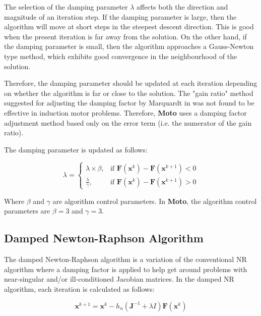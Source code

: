 \documentclass{article}
\begin{document}
The selection of the damping parameter $\lambda$ affects both the direction and magnitude of an iteration step. If the damping parameter is large, then the algorithm will move at short steps in the steepest descent direction. This is good when the present iteration is far away from the solution. On the other hand, if the damping parameter is small, then the algorithm approaches a Gauss-Newton type method, which exhibits good convergence in the neighbourhood of the solution.

Therefore, the damping parameter should be updated at each iteration depending on whether the algorithm is far or close to the solution. The "gain ratio" method suggested  for adjusting the damping factor by Marquardt in \cite{marguardt_1963}was not found to be effective in induction motor problems. Therefore, \textbf{Moto} uses a damping factor adjustment method based only on the error term (i.e. the numerator of the gain ratio). 

The damping parameter is updated as follows:

\begin{equation}
\lambda =
\begin{cases}
\lambda \times \beta, & \text{if } \mathbf{F}(\boldsymbol{x}^{k}) - \mathbf{F}(\boldsymbol{x}^{k+1}) < 0 \\
\frac{\lambda}{\gamma}, & \text{if } \mathbf{F}(\boldsymbol{x}^{k}) - \mathbf{F}(\boldsymbol{x}^{k+1}) > 0
\end{cases}
\end{equation}

Where $\beta$ and $\gamma$ are algorithm control parameters. In \textbf{Moto}, the algorithm control parameters are $\beta = 3$ and $\gamma = 3$.


\subsection{Damped Newton-Raphson Algorithm}
The damped Newton-Raphson algorithm is a variation of the conventional NR algorithm where a damping factor is applied to help get around problems with near-singular and/or ill-conditioned Jacobian matrices. In the damped NR algorithm, each iteration is calculated as follows:

\begin{equation}
\label{eqn_DNR}
\boldsymbol{x}^{k+1} = \boldsymbol{x}^{k} - h_{n} (\mathbf{J}^{-1} + \lambda I ) \mathbf{F}( \boldsymbol{x}^{k})
\end{equation}
\end{document}
